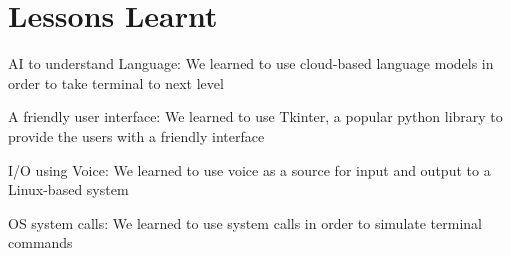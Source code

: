 \documentclass{article}
\begin{document}
\section*{Lessons Learnt}
AI to understand Language: We learned to use cloud-based language models in order to take terminal to next level

A friendly user interface: We learned to use Tkinter, a popular python library to provide the users with a friendly interface

I/O using Voice: We learned to use voice as a source for input and output to a Linux-based system

OS system calls: We learned to use system calls in order to simulate terminal commands



\end{document}
